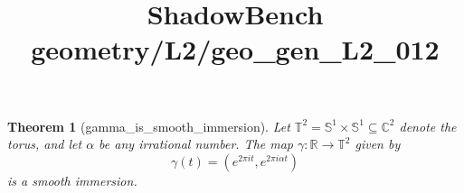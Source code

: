 \documentclass{article}
\title{ShadowBench geometry/L2/geo\_gen\_L2\_012}
\newtheorem{theorem}{Theorem}
\begin{document}
\maketitle

\begin{theorem}[gamma_is_smooth_immersion]
Let $\mathbb{T}^2 = \mathbb{S}^1 \times \mathbb{S}^1 \subseteq \mathbb{C}^2$ denote the torus, and let $\alpha$ be any irrational number. The map $\gamma: \mathbb{R} \to \mathbb{T}^2$ given by
\[ \gamma(t) = \left(e^{2\pi i t}, e^{2\pi i \alpha t}\right) \]
is a smooth immersion.
\end{theorem}
\end{document}
